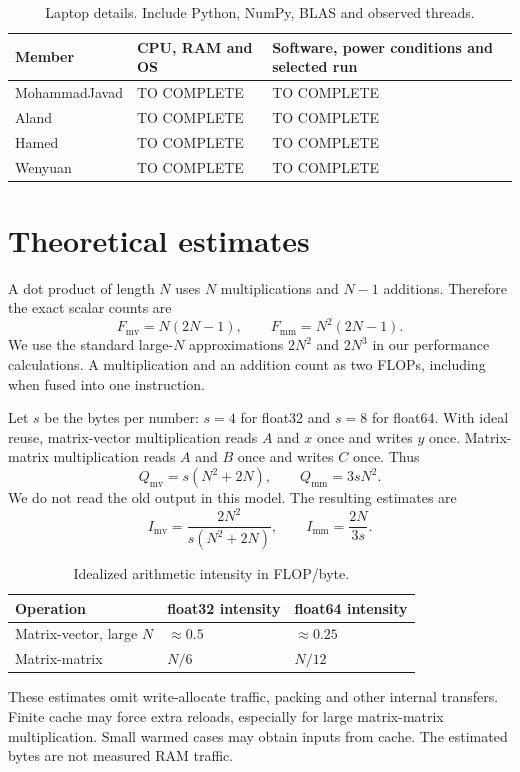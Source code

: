 \documentclass[11pt,a4paper]{article}
\begin{document}
\begin{table}[H]\centering\small
\begin{tabularx}{\linewidth}{@{}lXX@{}}\toprule
Member & CPU, RAM and OS & Software, power conditions and selected run \\\midrule
MohammadJavad & TO COMPLETE & TO COMPLETE \\
Aland & TO COMPLETE & TO COMPLETE \\
Hamed & TO COMPLETE & TO COMPLETE \\
Wenyuan & TO COMPLETE & TO COMPLETE \\\bottomrule
\end{tabularx}
\caption{Laptop details. Include Python, NumPy, BLAS and observed threads.}
\end{table}

\section{Theoretical estimates}
A dot product of length $N$ uses $N$ multiplications and $N-1$ additions.
Therefore the exact scalar counts are
\[
F_{\mathrm{mv}}=N(2N-1),\qquad
F_{\mathrm{mm}}=N^2(2N-1).
\]
We use the standard large-$N$ approximations $2N^2$ and $2N^3$ in our
performance calculations. A multiplication and an addition count as two
FLOPs, including when fused into one instruction.

Let $s$ be the bytes per number: $s=4$ for float32 and $s=8$ for float64.
With ideal reuse, matrix-vector multiplication reads $A$ and $x$ once and
writes $y$ once. Matrix-matrix multiplication reads $A$ and $B$ once and
writes $C$ once. Thus
\[
Q_{\mathrm{mv}}=s(N^2+2N),\qquad Q_{\mathrm{mm}}=3sN^2.
\]
We do not read the old output in this model. The resulting estimates are
\[
I_{\mathrm{mv}}=\frac{2N^2}{s(N^2+2N)},\qquad
I_{\mathrm{mm}}=\frac{2N}{3s}.
\]
\begin{table}[H]\centering
\begin{tabular}{@{}lll@{}}\toprule
Operation & float32 intensity & float64 intensity \\\midrule
Matrix-vector, large $N$ & $\approx0.5$ & $\approx0.25$ \\
Matrix-matrix & $N/6$ & $N/12$ \\\bottomrule
\end{tabular}
\caption{Idealized arithmetic intensity in FLOP/byte.}
\end{table}

These estimates omit write-allocate traffic, packing and other internal
transfers. Finite cache may force extra reloads, especially for large
matrix-matrix multiplication. Small warmed cases may obtain inputs from
cache. The estimated bytes are not measured RAM traffic.
\end{document}

